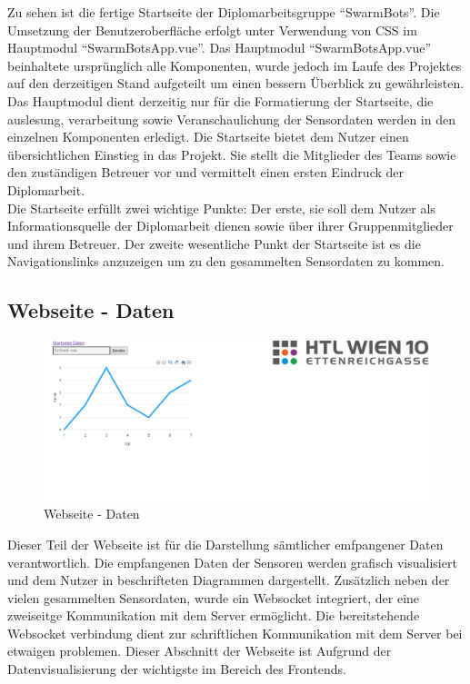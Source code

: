 Zu sehen ist die fertige Startseite der Diplomarbeitsgruppe ``SwarmBots''. 
Die Umsetzung der Benutzeroberfläche erfolgt unter Verwendung von CSS im Hauptmodul ``SwarmBotsApp.vue''.
%
Das Hauptmodul ``SwarmBotsApp.vue'' beinhaltete ursprünglich alle Komponenten, wurde jedoch im Laufe des Projektes
auf den derzeitigen Stand aufgeteilt um einen bessern Überblick zu gewährleisten.
%
Das Hauptmodul dient derzeitig nur für die Formatierung der Startseite, die auslesung, verarbeitung 
sowie Veranschaulichung der Sensordaten werden in den einzelnen Komponenten erledigt. 
%
Die Startseite bietet dem Nutzer einen übersichtlichen Einstieg in das Projekt. Sie stellt die Mitglieder des Teams
sowie den zuständigen Betreuer vor und vermittelt einen ersten Eindruck der Diplomarbeit. \\
% 
Die Startseite erfüllt zwei wichtige Punkte: Der erste, sie soll dem Nutzer als Informationsquelle der 
Diplomarbeit dienen sowie über ihrer Gruppenmitglieder und ihrem Betreuer. 
Der zweite wesentliche Punkt der Startseite ist es die Navigationslinks anzuzeigen um zu den 
gesammelten Sensordaten zu kommen. 

\subsection{Webseite - Daten}
\label{subsubsec:Webseite_Daten}

\begin{figure}[H]
  \includegraphics[width=\textwidth, center]{img/Webseite_Daten.png}
  \caption{Webseite - Daten}
  \label{fig:Webseite_Daten}
\end{figure}

Dieser Teil der Webseite ist für die Darstellung sämtlicher emfpangener Daten verantwortlich.
Die empfangenen Daten der Sensoren werden grafisch visualisiert und dem Nutzer in beschrifteten Diagrammen dargestellt. 
%
Zusätzlich neben der vielen gesammelten Sensordaten, wurde ein Websocket integriert, 
der eine zweiseitge Kommunikation mit dem Server ermöglicht. 
%
Die bereitstehende Websocket verbindung dient zur schriftlichen Kommunikation mit dem Server bei etwaigen problemen.
%
Dieser Abschnitt der Webseite ist Aufgrund der Datenvisualisierung der wichtigste im Bereich des Frontends.

